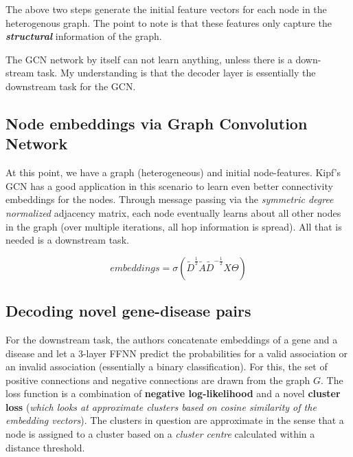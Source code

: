 \begin{sloppypar*}
        \noindent The above two steps generate the initial feature vectors for each node in
        the heterogenous graph. The point to note is that these features only
        capture the \textbf{\textit{structural}} information of the graph.

    \begin{mybox}
        The GCN network by itself can not learn anything, unless there is a down-
        stream task. My understanding is that the decoder layer is essentially the
        downstream task for the GCN.
    \end{mybox}
    
    \subsection{Node embeddings via Graph Convolution Network}
        At this point, we have a graph (heterogeneous) and initial node-features.
        Kipf's GCN \cite{kipfGCN} has a good application in this scenario to learn
        even better connectivity embeddings for the nodes. Through message passing
        via the \textit{symmetric degree normalized} adjacency matrix, each node
        eventually learns about all other nodes in the graph (over multiple iterations,
        all hop information is spread). All that is needed is a downstream task.

        \begin{equation}
            \mathit{embeddings} = 
                \sigma (\tilde{D}^{\frac{1}{2}} \tilde{A} \tilde{D}^{-\frac{1}{2}} X \Theta)
        \end{equation}

    \subsection{Decoding novel gene-disease pairs}
        For the downstream task, the authors concatenate embeddings of a gene and
        a disease  and let a $3$-layer FFNN predict the probabilities for a valid
        association or an invalid association (essentially a binary classification).
        For this, the set of positive connections and negative connections are drawn
        from the graph $G$. The loss function is a combination of \textbf{negative log-likelihood}
        and a novel \textbf{cluster loss} (\textit{which looks at approximate clusters based
        on cosine similarity of the embedding vectors}). The clusters in question
        are approximate in the sense that a node is assigned to a cluster based
        on a \textit{cluster centre} calculated within a distance threshold.\hfill\break
    

\end{sloppypar*}

